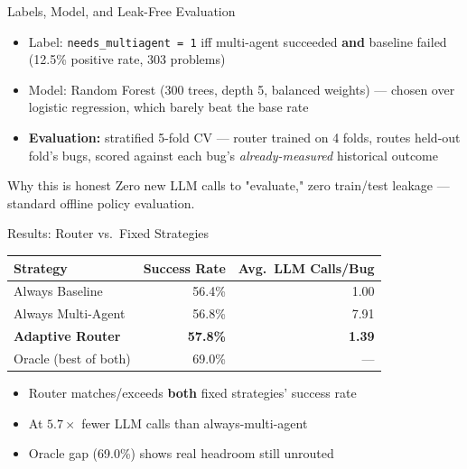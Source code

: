 \documentclass[aspectratio=169]{beamer}
\begin{document}
\begin{frame}{Labels, Model, and Leak-Free Evaluation}
\begin{itemize}
    \item Label: \texttt{needs\_multiagent = 1} iff multi-agent succeeded \textbf{and} baseline failed (12.5\% positive rate, 303 problems)
    \item Model: Random Forest (300 trees, depth 5, balanced weights) --- chosen over logistic regression, which barely beat the base rate
    \item \textbf{Evaluation:} stratified 5-fold CV --- router trained on 4 folds, routes held-out fold's bugs, scored against each bug's \emph{already-measured} historical outcome
\end{itemize}
\begin{block}{Why this is honest}
Zero new LLM calls to "evaluate," zero train/test leakage --- standard offline policy evaluation.
\end{block}
\end{frame}

\begin{frame}{Results: Router vs.\ Fixed Strategies}
\begin{table}
\centering
\begin{tabular}{@{}lrr@{}}
\toprule
Strategy & Success Rate & Avg.\ LLM Calls/Bug \\
\midrule
Always Baseline            & 56.4\% & 1.00 \\
Always Multi-Agent         & 56.8\% & 7.91 \\
\textbf{Adaptive Router}   & \textbf{57.8\%} & \textbf{1.39} \\
Oracle (best of both)      & 69.0\% & --- \\
\bottomrule
\end{tabular}
\end{table}
\begin{itemize}
    \item Router matches/exceeds \textbf{both} fixed strategies' success rate
    \item At $\mathbf{5.7\times}$ fewer LLM calls than always-multi-agent
    \item Oracle gap (69.0\%) shows real headroom still unrouted
\end{itemize}
\end{frame}
\end{document}
